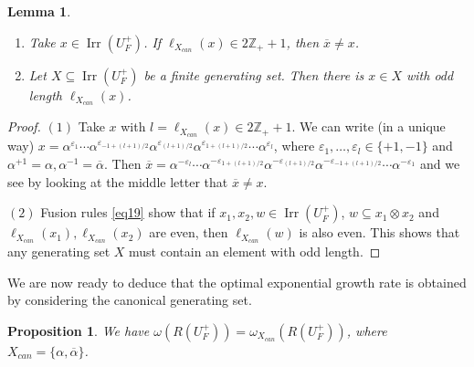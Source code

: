 \documentclass[11 pt, leqno]{amsart}
\newcommand{\eps}{\varepsilon}
\newcommand{\ov}{\overline}
\newcommand{\ZZ}{\mathbb{Z}}
\DeclareMathOperator{\Irr}{Irr}
\newtheorem{proposition}[theorem]{Proposition}
\newtheorem{lemma}[theorem]{Lemma}
\theoremstyle{definition}
\numberwithin{equation}{section}
\begin{document}
\begin{lemma}\label{lemma14}\noindent
\begin{enumerate}
\item Take $x\in \Irr(U_F^+)$. If $\ell_{X_{can}}(x)\in 2\ZZ_++1$, then $\ov{x}\neq x$.
\item Let $X\subseteq \Irr(U_F^+)$ be a finite generating set. Then there is $x\in X$ with odd length $\ell_{X_{can}}(x)$.
\end{enumerate}
\end{lemma}

\begin{proof}
$(1)$ Take $ x$ with $l=\ell_{X_{can}}(x)\in 2\ZZ_+ +1$. We can write (in a unique way) $x=\alpha^{\eps_1}\cdots \alpha^{\eps_{-1+(l+1)/2}} \alpha^{\eps_{(l+1)/2}}\alpha^{\eps_{1+(l+1)/2}}\cdots \alpha^{\eps_l}$, where $\eps_1,\dotsc,\eps_l\in \{+1,-1\}$ and $\alpha^{+1}=\alpha,\alpha^{-1}=\ov\alpha$. Then $\ov{x}=\alpha^{-\eps_l}\cdots \alpha^{-\eps_{1+(l+1)/2}} \alpha^{-\eps_{(l+1)/2}}\alpha^{-\eps_{-1+(l+1)/2}}\cdots \alpha^{-\eps_1}$ and we see by looking at the middle letter that $\ov{x}\neq x$.

$(2)$ Fusion rules \eqref{eq19} show that if $x_1,x_2,w\in \Irr(U_F^+)$, $w\subseteq x_1\otimes x_2$ and $\ell_{X_{can}}(x_1),\ell_{X_{can}}(x_2)$ are even, then $\ell_{X_{can}}(w)$ is also even. This shows that any generating set $X$ must contain an element with odd length. 
\end{proof}

We are now ready to deduce that the optimal exponential growth rate is obtained by considering the canonical generating set.

\begin{proposition}\label{prop13}
We have $\omega(R(U_F^+))=\omega_{X_{can}}(R(U_F^+))$, where $X_{can}=\{\alpha,\ov\alpha\}$.
\end{proposition}
\end{document}
